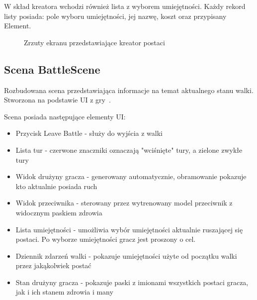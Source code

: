 \documentclass{SGGW-thesis}
\begin{document}
W skład kreatora wchodzi również lista z wyborem umiejętności. Każdy rekord listy posiada: pole wyboru umiejętności, jej nazwę, koszt oraz przypisany Element.

\begin{figure}[H]
  \hfill
  \hfill
  \hfill
  \caption{Zrzuty ekranu przedstawiające kreator postaci}
\end{figure}

\subsection{Scena BattleScene}
Rozbudowana scena przedstawiająca informacje na temat aktualnego stanu walki. Stworzona na podstawie UI z gry~\cite{SMT3}.

Scena posiada następujące elementy UI:
\begin{itemize}
  \item{Przycisk Leave Battle - służy do wyjścia z walki}
  \item{Lista tur - czerwone znaczniki oznaczają "wciśnięte" tury, a zielone zwykłe tury}
  \item{Widok drużyny gracza - generowany automatycznie, obramowanie pokazuje kto aktualnie posiada ruch}
  \item{Widok przeciwnika - sterowany przez wytrenowany model przeciwnik z widocznym paskiem zdrowia}
  \item{Lista umiejętności - umożliwia wybór umiejętności aktualnie ruszającej się postaci. Po wyborze umiejętności gracz jest proszony o cel.}
  \item{Dziennik zdarzeń walki - pokazuje umiejętności użyte od początku walki przez jakąkolwiek postać}
  \item{Stan drużyny gracza - pokazuje paski z imionami wszystkich postaci gracza, jak i ich stanem zdrowia i many}
\end{itemize}
\end{document}
